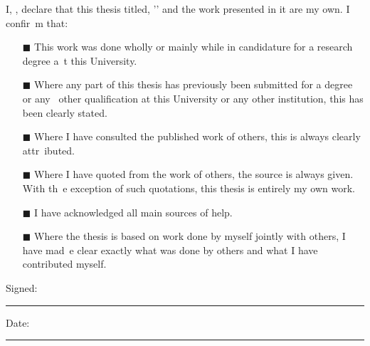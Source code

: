 I, \authornames, declare that this thesis titled, '\ttitle' and the work presented in it are my own. I confir\
m that:

\begin{itemize}
\item[\tiny{$\blacksquare$}] This work was done wholly or mainly while in candidature for a research degree a\
  t this University.
\item[\tiny{$\blacksquare$}] Where any part of this thesis has previously been submitted for a degree or any \
  other qualification at this University or any other institution, this has been clearly stated.
\item[\tiny{$\blacksquare$}] Where I have consulted the published work of others, this is always clearly attr\
  ibuted.
\item[\tiny{$\blacksquare$}] Where I have quoted from the work of others, the source is always given. With th\
  e exception of such quotations, this thesis is entirely my own work.
\item[\tiny{$\blacksquare$}] I have acknowledged all main sources of help.
\item[\tiny{$\blacksquare$}] Where the thesis is based on work done by myself jointly with others, I have mad\
  e clear exactly what was done by others and what I have contributed myself.\\
\end{itemize}

Signed:\\
\rule[1em]{25em}{0.5pt} %

Date:\\
\rule[1em]{25em}{0.5pt} %
